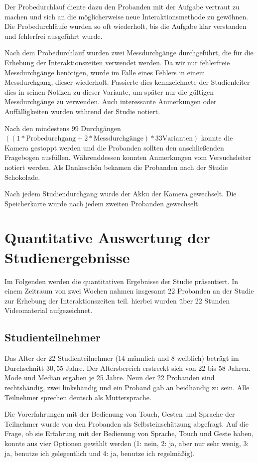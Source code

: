Der Probedurchlauf diente dazu den Probanden mit der Aufgabe vertraut zu machen und sich an die möglicherweise neue Interaktionsmethode zu gewöhnen.
Die Probedurchläufe wurden so oft wiederholt, bis die Aufgabe klar verstanden und fehlerfrei ausgeführt wurde. 

Nach dem Probedurchlauf wurden zwei Messdurchgänge durchgeführt, die für die Erhebung der Interaktionszeiten verwendet werden.
Da wir nur fehlerfreie Messdurchgänge benötigen, wurde im Falle eines Fehlers in einem Messdurchgang, dieser wiederholt.
Passierte dies kennzeichnete der Studienleiter dies in seinen Notizen zu dieser Variante, um später nur die gültigen Messdurchgänge zu verwenden.
Auch interessante Anmerkungen oder Auffälligkeiten wurden während der Studie notiert.

Nach den mindestens 99 Durchgängen $((1 * \text{Probedurchgang} + 2 * \text{Messdurchgänge}) * 33 \text{Varianten})$ konnte die Kamera gestoppt werden und die Probanden sollten den anschließenden Fragebogen ausfüllen.
Währenddessen konnten Anmerkungen vom Versuchsleiter notiert werden. 
Als Dankeschön bekamen die Probanden nach der Studie Schokolade.

Nach jedem Studiendurchgang wurde der Akku der Kamera gewechselt. Die Speicherkarte wurde nach jedem zweiten Probanden gewechselt.

\section[Quantitative Auswertung]{Quantitative Auswertung der Studienergebnisse}
Im Folgenden werden die quantitativen Ergebnisse der Studie präsentiert.
In einem Zeitraum von zwei Wochen nahmen insgesamt 22 Probanden an der Studie zur Erhebung der Interaktionszeiten teil.
hierbei wurden über 22 Stunden Videomaterial aufgezeichnet. 
\subsection[Studienteilnehmer]{Studienteilnehmer}
Das Alter der 22 Studienteilnehmer (14 männlich und 8 weiblich) beträgt im Durchschnitt $30,55$ Jahre. 
Der Altersbereich erstreckt sich von 22 bis 58 Jahren. 
Mode und Median ergaben je 25 Jahre. Neun der 22 Probanden sind rechtshändig, zwei linkshändig und ein Proband gab an beidhändig zu sein. 
Alle Teilnehmer sprechen deutsch als Muttersprache.

Die Vorerfahrungen mit der Bedienung von Touch, Gesten und Sprache der Teilnehmer wurde von den Probanden als Selbsteinschätzung abgefragt. 
Auf die Frage, ob sie Erfahrung mit der Bedienung von Sprache, Touch und Geste haben, konnte aus vier Optionen gewählt werden (1: nein, 2: ja, aber nur sehr wenig, 3: ja, benutze ich gelegentlich und 4: ja, benutze ich regelmäßig). 

